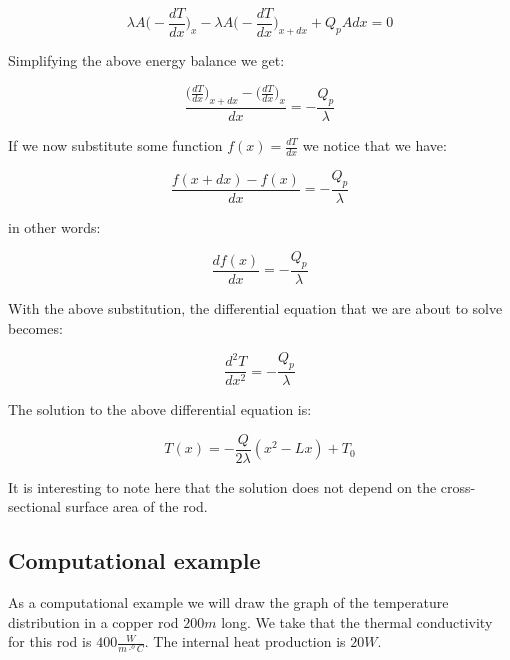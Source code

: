 \documentclass[10pt]{article}
\begin{document}
\begin{equation}
\lambda A \Big(- \frac{dT}{dx} \Big)_x - \lambda A \Big(- \frac{dT}{dx} \Big)_{x + dx} + Q_p A dx = 0
\end{equation}

Simplifying the above energy balance we get:

\begin{equation*}
\frac{\Big(\frac{dT}{dx} \Big)_{x + dx} - \Big(\frac{dT}{dx} \Big)_x  }{dx} = - \frac{Q_p}{\lambda}
\end{equation*}

If we now substitute some function $f(x) = \frac{dT}{dx}$ we notice that we have:

\begin{equation*}
\frac{f(x + dx) - f(x)}{dx} = - \frac{Q_p}{\lambda}
\end{equation*}

in other words:

\begin{equation}
\frac{df(x)}{dx} = - \frac{Q_p}{\lambda}
\end{equation}

With the above substitution, the differential equation that we are about to solve becomes:

\begin{equation}
\frac{d^2T}{dx^2} = - \frac{Q_p}{\lambda}
\end{equation}

The solution to the above differential equation is:

\begin{equation}
T(x) = - \frac{Q}{2 \lambda} (x^2 - Lx) + T_0
\label{eq:solution}
\end{equation}

It is interesting to note here that the solution does not depend on the cross-sectional surface area of the rod.




\subsection*{Computational example}

As a computational example we will draw the graph of the temperature distribution in a copper rod $200 m$ long. We take that the thermal conductivity for this rod is $400 \frac{W}{m \cdot ^o C}$. The internal heat production is $20 W$.
\end{document}
